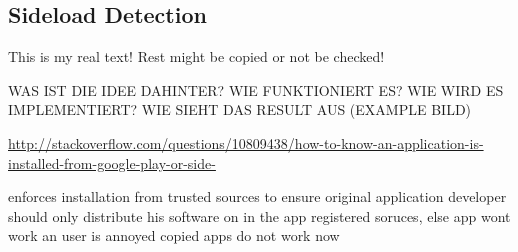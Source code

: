 \subsection{Sideload Detection} \label{subsection:counter-tampering-sideload}
This is my real text! Rest might be copied or not be checked!

WAS IST DIE IDEE DAHINTER? WIE FUNKTIONIERT ES? WIE WIRD ES IMPLEMENTIERT? WIE SIEHT DAS RESULT AUS (EXAMPLE BILD)\newline

\url{http://stackoverflow.com/questions/10809438/how-to-know-an-application-is-installed-from-google-play-or-side-}

enforces installation from trusted sources to ensure original application
developer should only distribute his software on in the app registered soruces, else app wont work an user is annoyed
copied apps do not work now

